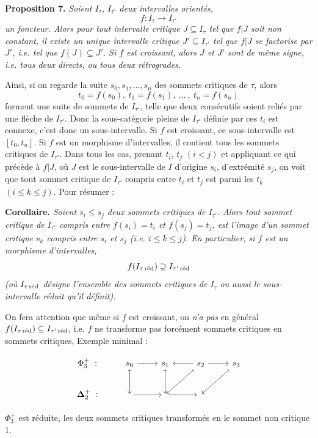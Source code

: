 \documentclass[11pt]{article}
\newcommand{\printedpage}[1]{\marginpar{\footnotesize p.~#1}}
\newcommand{\msp}[1]{\marginpar{\footnotesize [#1]}}
\newcommand{\bDelta}{\boldsymbol{\Delta}}
\newcommand{\red}{\text{\upshape réd}}
\begin{document}
\textbf{Proposition 7.} \textit{Soient $I_\tau$, $I_{\tau'}$ deux intervalles orientés,}
\[
f : I_\tau\longrightarrow I_{\tau'}
\]
\textit{un foncteur. Alors pour tout intervalle critique $J\subseteq I_\tau$ tel que $f|J$ soit non constant, il existe un unique intervalle critique $J'\subseteq I_{\tau'}$ tel que $f|J$ se factorise par $J'$, i.e. tel que $f(J)\subseteq J'$. Si $f$ est croissant, alors $J$ et $J'$ sont de même signe,}
\msp{page 34}
\textit{i.e. tous deux directs, ou tous deux rétrogrades.}

Ainsi, si on regarde la suite $s_0,s_1,\ldots,s_n$ des sommets critiques de $\tau$, alors
\[
t_0=f(s_0),\ t_1=f(s_1),\ \ldots\ ,\ t_n=f(s_n)
\]
forment une suite de sommets de $I_{\tau'}$, telle que deux consécutifs soient reliés par une flèche de $I_{\tau'}$. Donc la sous-catégorie pleine de $I_{\tau'}$ définie par ces $t_i$ est connexe, c'est donc un sous-intervalle. Si $f$ est croissant, ce sous-intervalle est $[t_0,t_n]$. Si $f$ est un morphisme d'intervalles, il contient tous les sommets critiques de $I_{\tau'}$. Dans tous les cas, prenant $t_i$, $t_j$ $(i<j)$ et appliquant ce qui précède à $f|J$, où $J$ est le sous-intervalle de $I$ d'origine $s_i$, d'extrémité $s_j$, on voit que tout sommet critique de $I_{\tau'}$ compris entre $t_i$ et $t_j$ est parmi les $t_k$ $(i\leq k\leq j)$. Pour résumer :

\textbf{Corollaire.} \textit{Soient $s_i\leq s_j$ deux sommets critiques de $I_{\tau'}$. Alors tout sommet critique de $I_{\tau'}$ compris entre $f(s_i)=t_i$ et $f(s_j)=t_j$, est l'image d'un sommet critique $s_k$ compris entre $s_i$ et $s_j$ (i.e. $i\leq k\leq j$). En particulier, si $f$ est un morphisme d'intervalles,} %
\[
f(I_{\tau\,\red})\supseteq I_{\tau'\,\red}
\]
\textit{(où $I_{\tau\,\red}$ désigne l'ensemble des sommets critiques de $I_\tau$ ou aussi le sous-intervalle réduit qu'il définit).}

\msp{page 35}
On fera attention que même si $f$ est croissant, on \textit{n'a pas} en général $f(I_{\tau\,\red})\subseteq I_{\tau'\,\red}$, i.e. $f$ ne transforme pas forcément sommets critiques en sommets critiques, Exemple minimal :
\printedpage{23}

\noindent
\begin{minipage}[c]{0.6\textwidth}
\[
\begin{tikzcd}
\Phi_3^+\ : & s_0 \arrow[r] \arrow[d, mapsto] & s_1 \arrow[d, mapsto] & s_2 \arrow[l] \arrow[r] \arrow[dl, mapsto] & s_3 \arrow[dl, mapsto] \\
\bDelta_2^+\ : & {} \arrow[r] & {} \arrow[r] & {} &
\end{tikzcd}
\]
\end{minipage}\hfill
\begin{minipage}[c]{0.35\textwidth}
$\Phi_3^+$ est réduite, les deux sommets critiques transformés en le sommet non critique 1.
\end{minipage}
\end{document}
